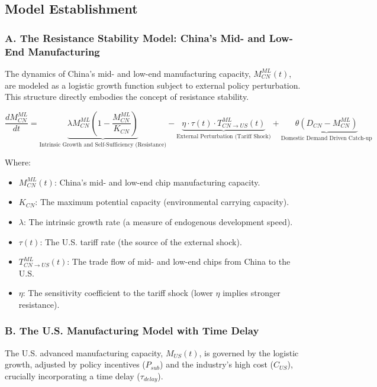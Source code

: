 \documentclass{apmcmthesis}
\begin{document}
\subsection{Model Establishment}
\subsubsection{A. The Resistance Stability Model: China's Mid- and Low-End Manufacturing}

The dynamics of China's mid- and low-end manufacturing capacity, $M_{CN}^{ML}(t)$, are modeled as a logistic growth function subject to external policy perturbation. This structure directly embodies the concept of resistance stability.

$$
\frac{dM_{CN}^{ML}}{dt} = \underbrace{\lambda M_{CN}^{ML} \left(1 - \frac{M_{CN}^{ML}}{K_{CN}}\right)}_{\text{Intrinsic Growth and Self-Sufficiency (Resistance)}} - \underbrace{\eta \cdot \tau(t) \cdot T_{CN \to US}^{ML}(t)}_{\text{External Perturbation (Tariff Shock)}} + \underbrace{\theta (D_{CN} - M_{CN}^{ML})}_{\text{Domestic Demand Driven Catch-up}}
$$

Where:
\begin{itemize}
    \item $M_{CN}^{ML}(t)$: China's mid- and low-end chip manufacturing capacity.
    \item $K_{CN}$: The maximum potential capacity (environmental carrying capacity).
    \item $\lambda$: The intrinsic growth rate (a measure of endogenous development speed).
    \item $\tau(t)$: The U.S. tariff rate (the source of the external shock).
    \item $T_{CN \to US}^{ML}(t)$: The trade flow of mid- and low-end chips from China to the U.S.
    \item $\eta$: The sensitivity coefficient to the tariff shock (lower $\eta$ implies stronger resistance).
\end{itemize}

\subsubsection{B. The U.S. Manufacturing Model with Time Delay}

The U.S. advanced manufacturing capacity, $M_{US}(t)$, is governed by the logistic growth, adjusted by policy incentives ($P_{sub}$) and the industry's high cost ($C_{US}$), crucially incorporating a time delay ($\tau_{delay}$).
\end{document}
